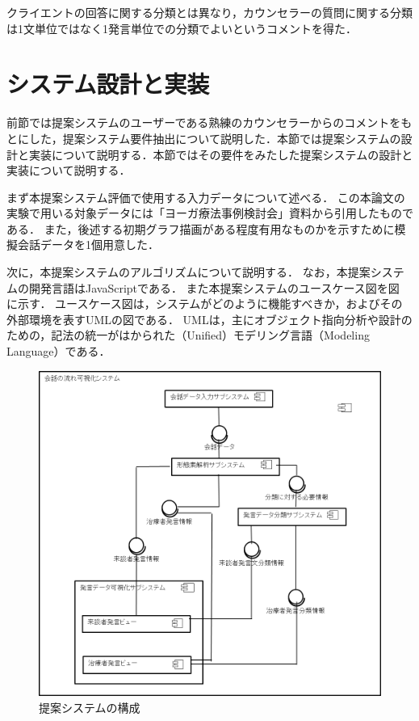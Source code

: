 \documentclass[shuuron]{kuee}
\begin{document}
クライエントの回答に関する分類とは異なり，カウンセラーの質問に関する分類は1文単位ではなく1発言単位での分類でよいというコメントを得た．


\section{システム設計と実装}





前節では提案システムのユーザーである熟練のカウンセラーからのコメントをもとにした，提案システム要件抽出について説明した．本節では提案システムの設計と実装について説明する．本節ではその要件をみたした提案システムの設計と実装について説明する．



まず本提案システム評価で使用する入力データについて述べる．
この本論文の実験で用いる対象データには「ヨーガ療法事例検討会」資料から引用したものである．
また，後述する初期グラフ描画がある程度有用なものかを示すために模擬会話データを1個用意した．

次に，本提案システムのアルゴリズムについて説明する．
なお，本提案システムの開発言語はJavaScriptである．
また本提案システムのユースケース図を図
に示す．
ユースケース図は，システムがどのように機能すべきか，およびその外部環境を表すUMLの図である．
UMLは，主にオブジェクト指向分析や設計のための，記法の統一がはかられた（Unified）モデリング言語（Modeling Language）である．


\begin{figure}
  \begin{center}
    \includegraphics[width=\linewidth]{4_2.png}
  \end{center}
  \caption{提案システムの構成}
  \label{fig:4_2}
\end{figure}
\end{document}
